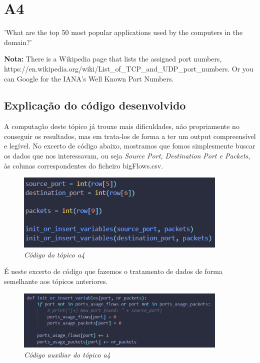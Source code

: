\chapter{A4}

{\LARGE 'What are the top 50 most popular applications used by the computers in the domain?'}

\textbf{Nota:} There is a Wikipedia page that lists the assigned port numbers, https://en.wikipedia.org/wiki/List\_of\_TCP\_and\_UDP\_port\_numbers. Or you can Google for the IANA’s Well Known Port Numbers.

\section{Explicação do código desenvolvido}

A computação deste tópico já trouxe mais dificuldades, não propriamente no conseguir os resultados, mas em trata-los de forma a ter um output compreensível e legível. No excerto de código abaixo, mostramos que fomos simplesmente buscar os dados que nos interessavam, ou seja \textit{Source Port, Destination Port e Packets}, às colunas correspondentes do ficheiro bigFlows.csv.

\begin{figure}[h!]
    \label{high}
    \centering
    \includegraphics[width=0.9\textwidth]{Images/a4/a4.png}
    \caption{\textit{Código do tópico a4}}
\end{figure}

\newpage

É neste excerto de código que fazemos o tratamento de dados de forma semelhante aos tópicos anteriores.

\begin{figure}[h!]
    \label{high}
    \centering
    \includegraphics[width=0.9\textwidth]{Images/a4/initOrInsertVariables.png}
    \caption{\textit{Código auxiliar do tópico a4}}
\end{figure}

